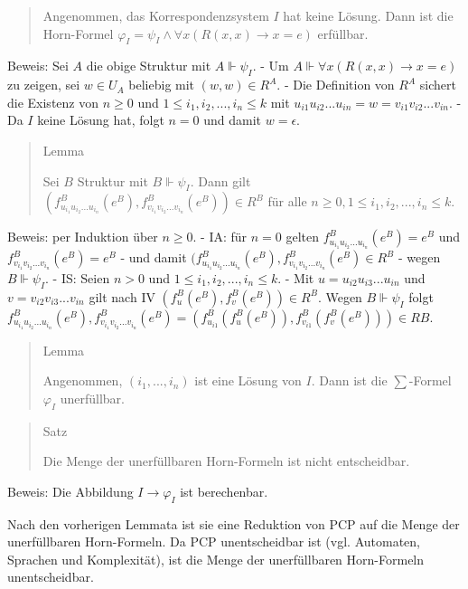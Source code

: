 \documentclass[a4paper]{article}
\begin{document}
\begin{multicols}{3}
\begin{quote}
    Angenommen, das Korrespondenzsystem $I$ hat keine Lösung. Dann ist die
    Horn-Formel $\varphi_I=\psi_I \wedge \forall x(R(x,x)\rightarrow x=e)$
    erfüllbar.
  \end{quote}

  Beweis: Sei $A$ die obige Struktur mit $A\Vdash\psi_I$. - Um
  $A\Vdash\forall x(R(x,x)\rightarrow x=e)$ zu zeigen, sei $w\in U_A$
  beliebig mit $(w,w)\in R^A$. - Die Definition von $R^A$ sichert die
  Existenz von $n\geq 0$ und $1\leq i_1,i_2,...,i_n\leq k$ mit
  $u_{i1} u_{i2}...u_{in}=w=v_{i1} v_{i2} ...v_{in}$. - Da $I$ keine
  Lösung hat, folgt $n=0$ und damit $w=\epsilon$.

  \begin{quote}
    Lemma

    Sei $B$ Struktur mit $B\Vdash\psi_I$. Dann gilt
    $(f_{u_{i_1} u_{i_2} ...u_{i_n}}^B (e^B),f_{v_{i_1} v_{i_2}...v_{i_n}}^B(e^B))\in R^B$
    für alle $n\geq 0, 1\leq i_1,i_2,...,i_n \leq k$.
  \end{quote}

  Beweis: per Induktion über $n\geq 0$. - IA: für $n=0$ gelten
  $f_{u_{i_1} u_{i_2} ...u_{i_n}}^B(e^B) =e^B$ und
  $f_{v_{i_1} v_{i_2}...v_{i_n}}^B(e^B) =e^B$ - und damit
  $(f_{u_{i_1} u_{i_2} ...u_{i_n}}^B(e^B), f_{v_{i_1} v_{i_2}...v_{i_n}}^B(e^B) \in R^B$
  - wegen $B\Vdash\psi_I$. - IS: Seien $n>0$ und
  $1\leq i_1 ,i_2 ,...,i_n\leq k$. - Mit $u=u_{i2} u_{i3} ...u_{in}$ und
  $v=v_{i2} v_{i3} ...v_{in}$ gilt nach IV
  $(f_u^B(e^B),f_v^B(e^B))\in R^B$. Wegen $B\Vdash\psi_I$ folgt
  $f_{u_{i_1} u_{i_2} ...u_{i_n}}^B(e^B), f_{v_{i_1} v_{i_2}...v_{i_n}}^B(e^B) = (f_{u_{i1}}^B (f_u^B(e^B)),f_{v_{i1}}^B (f_v^B(e^B)))\in RB$.

  \begin{quote}
    Lemma

    Angenommen, $(i_1,...,i_n)$ ist eine Lösung von $I$. Dann ist die
    $\sum$-Formel $\varphi_I$ unerfüllbar.
  \end{quote}

  \begin{quote}
    Satz

    Die Menge der unerfüllbaren Horn-Formeln ist nicht entscheidbar.
  \end{quote}

  Beweis: Die Abbildung $I\rightarrow\varphi_I$ ist berechenbar.

  Nach den vorherigen Lemmata ist sie eine Reduktion von PCP auf die Menge
  der unerfüllbaren Horn-Formeln. Da PCP unentscheidbar ist (vgl.
  Automaten, Sprachen und Komplexität), ist die Menge der unerfüllbaren
  Horn-Formeln unentscheidbar.


\end{multicols}
\end{document}
